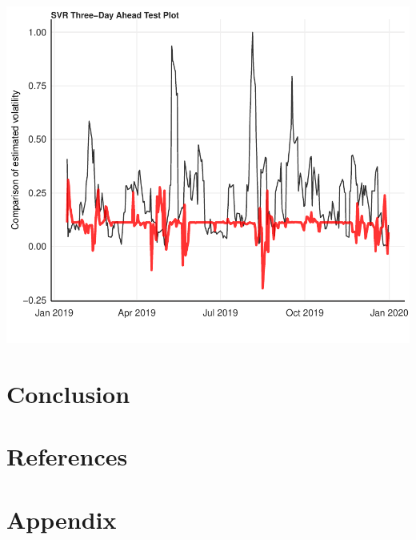 \documentclass[11pt,preprint, authoryear]{elsarticle}
\let\origfigure\figure
\let\endorigfigure\endfigure
\renewenvironment{figure}[1][2] {
    \expandafter\origfigure\expandafter[H]
} {
    \endorigfigure
}
\numberwithin{equation}{section}
\numberwithin{figure}{section}
\numberwithin{table}{section}
\newlength{\cslhangindent}
\newenvironment{CSLReferences}%
  {\setlength{\parindent}{0pt}%
  \everypar{\setlength{\hangindent}{\cslhangindent}}\ignorespaces}%
  {\par}
\begin{document}
\begin{figure}[H]

{\centering \includegraphics{Essay_files/figure-latex/plot_3_test-1} 

}

\caption{LSTM Three-Day Ahead Test Forecast}\label{fig:plot_3_test}
\end{figure}

\hypertarget{conclusion}{%
\section{Conclusion}\label{conclusion}}

\newpage

\hypertarget{references}{%
\section*{References}\label{references}}

\hypertarget{refs}{}
\begin{CSLReferences}{0}{0}
\end{CSLReferences}

\hypertarget{appendix}{%
\section*{Appendix}\label{appendix}}
\end{document}
